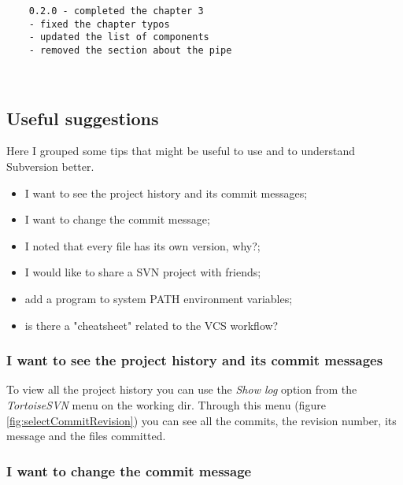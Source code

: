\begin{verbatim}
    0.2.0 - completed the chapter 3
    - fixed the chapter typos
    - updated the list of components
    - removed the section about the pipe
\end{verbatim}

\ \\













\subsection{Useful suggestions}
\label{section:UsefulSuggestions}

Here I grouped some tips that might be useful to use and to understand Subversion better.


\begin{itemize}
    
    \item I want to see the project history and its commit messages;
    \item I want to change the commit message;
    \item I noted that every file has its own version, why?;
    \item I would like to share a SVN project with friends;
    \item add a program to system PATH environment variables;
    \item is there a "cheatsheet" related to the VCS workflow?
    
\end{itemize}


\subsubsection{I want to see the project history and its commit messages}
\label{subsubsectio:ProjectHisory}

To view all the project history you can use the \textit{Show log} option from the \textit{TortoiseSVN} menu on the working dir. Through this menu (figure \ref{fig:selectCommitRevision}) you can see all the commits, the revision number, its message and the files committed.


\subsubsection{I want to change the commit message}
\label{subsubsection:EditCommitMessage}


